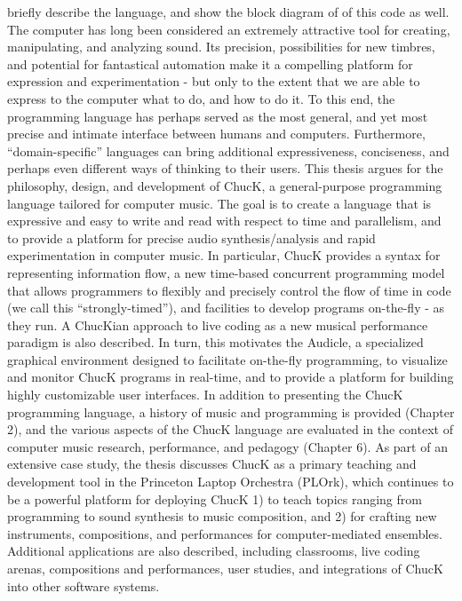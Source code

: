 briefly describe the language, and show the block diagram of of this code as well. 
The computer has long been considered an extremely attractive tool for creating,
manipulating, and analyzing sound. Its precision, possibilities for new timbres, and
potential for fantastical automation make it a compelling platform for expression
and experimentation - but only to the extent that we are able to express to the
computer what to do, and how to do it. To this end, the programming language
has perhaps served as the most general, and yet most precise and intimate interface
between humans and computers. Furthermore, “domain-specific” languages can
bring additional expressiveness, conciseness, and perhaps even different ways of
thinking to their users.
This thesis argues for the philosophy, design, and development of ChucK, a
general-purpose programming language tailored for computer music. The goal is to
create a language that is expressive and easy to write and read with respect to time
and parallelism, and to provide a platform for precise audio synthesis/analysis and
rapid experimentation in computer music. In particular, ChucK provides a syntax
for representing information flow, a new time-based concurrent programming model
that allows programmers to flexibly and precisely control the flow of time in code (we
call this “strongly-timed”), and facilities to develop programs on-the-fly - as they
run. A ChucKian approach to live coding as a new musical performance paradigm is
also described. In turn, this motivates the Audicle, a specialized graphical environment 
designed to facilitate on-the-fly programming, to visualize and monitor ChucK
programs in real-time, and to provide a platform for building highly customizable
user interfaces.
In addition to presenting the ChucK programming language, a history of music
and programming is provided (Chapter 2), and the various aspects of the ChucK
language are evaluated in the context of computer music research, performance,
and pedagogy (Chapter 6). As part of an extensive case study, the thesis discusses
ChucK as a primary teaching and development tool in the Princeton Laptop Orchestra 
(PLOrk), which continues to be a powerful platform for deploying ChucK
1) to teach topics ranging from programming to sound synthesis to music composition, 
and 2) for crafting new instruments, compositions, and performances for
computer-mediated ensembles. Additional applications are also described, including 
classrooms, live coding arenas, compositions and performances, user studies,
and integrations of ChucK into other software systems.
